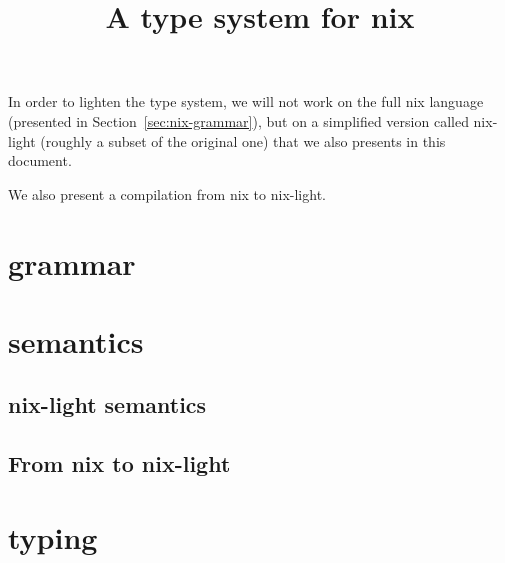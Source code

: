 

\title{A type system for nix}


\maketitle

In order to lighten the type system, we will not work on the full nix language
(presented in Section~\ref{sec:nix-grammar}), but on a simplified version
called nix-light (roughly a subset of the original one) that we also presents
in this document.

We also present a compilation from nix to nix-light.

\section{grammar}


\section{semantics}

\subsection{nix-light semantics}


\subsection{From nix to nix-light}


\section{typing}



\todos{}




